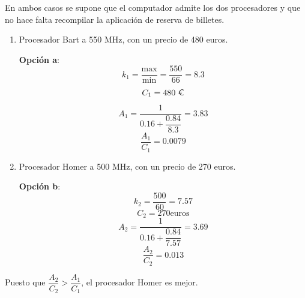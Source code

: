 En ambos casos se supone que el computador admite los dos procesadores y que no hace falta recompilar la aplicación de reserva de billetes.
\begin{enumerate}
    \item Procesador Bart a 550 MHz, con un precio de 480 euros.
\begin{tcolorbox}[colback=white,colframe=cyan!50!black,fonttitle=\bfseries]
\textbf{Opción a}:
\[
k_1=\dfrac{\text{max}}{\text{min}}=\dfrac{550}{66}=8.3
\]
\[
C_1=480\textup{ \euro}
\]
\[
A_1=\dfrac{1}{0.16+\dfrac{0.84}{8.3}}=3.83
\]
\[
\dfrac{A_1}{C_1}=0.0079
\]
\end{tcolorbox}    
    \item Procesador Homer a 500 MHz, con un precio de 270 euros.
\begin{tcolorbox}[colback=white,colframe=cyan!50!black,fonttitle=\bfseries]
\textbf{Opción b}:
\[
k_2=\dfrac{500}{60}=7.57
\]
\[
C_2=270\text{euros}
\]
\[
A_2=\dfrac{1}{0.16+\dfrac{0.84}{7.57}}=3.69
\]
\[
\dfrac{A_2}{C_2}=0.013
\]
\end{tcolorbox}    
\end{enumerate}
\begin{tcolorbox}[colback=white,colframe=cyan!50!black,fonttitle=\bfseries]
Puesto que $\dfrac{A_2}{C_2}>\dfrac{A_1}{C_1}$, el procesador Homer es mejor.

\end{tcolorbox}
